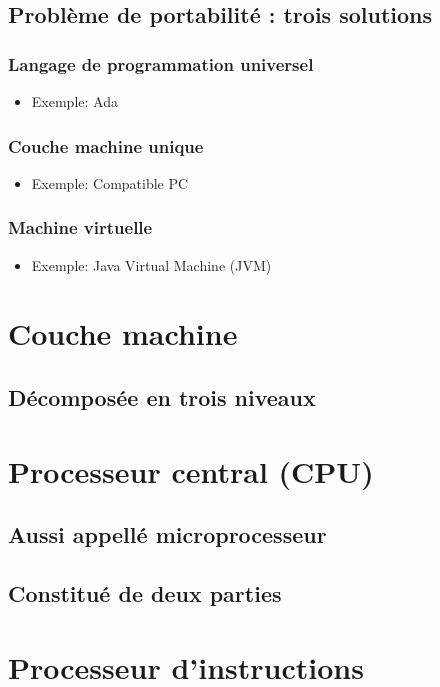 		\subsection{Problème de portabilité : trois solutions}
			\subsubsection{Langage de programmation universel}
				\begin{itemize}
					\item[\textbullet]Exemple: Ada
				\end{itemize}
			\subsubsection{Couche machine unique}
				\begin{itemize}
					\item[\textbullet] Exemple: Compatible PC
				\end{itemize}
			\subsubsection{Machine virtuelle}
				\begin{itemize}
					\item[\textbullet] Exemple: Java Virtual Machine (JVM) 
				\end{itemize}
				
		
	\section{Couche machine}
		\subsection{Décomposée en trois niveaux}
	\section{Processeur central (CPU)}
		\subsection{Aussi appellé microprocesseur}
		\subsection{Constitué de deux parties}
	\section{Processeur d'instructions}
